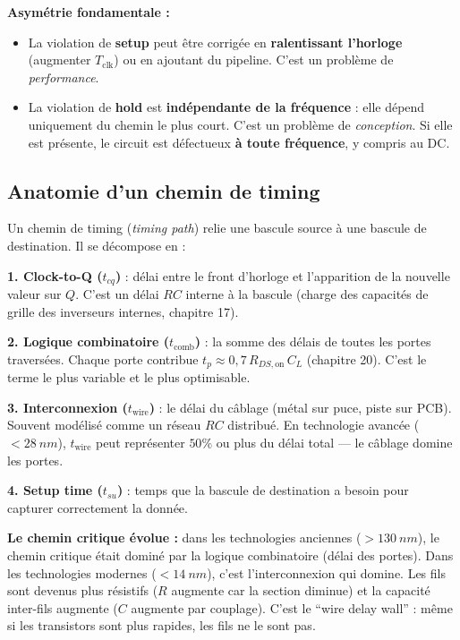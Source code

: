 \documentclass[12pt,a4paper,twoside]{book}
\begin{document}
\begin{attention}
\textbf{Asymétrie fondamentale :}
\begin{itemize}[nosep]
\item La violation de \textbf{setup} peut être corrigée en \textbf{ralentissant l'horloge} (augmenter $T_{\text{clk}}$) ou en ajoutant du pipeline. C'est un problème de \textit{performance}.
\item La violation de \textbf{hold} est \textbf{indépendante de la fréquence} : elle dépend uniquement du chemin le plus court. C'est un problème de \textit{conception}. Si elle est présente, le circuit est défectueux \textbf{à toute fréquence}, y compris au DC.
\end{itemize}
\end{attention}

\subsection{Anatomie d'un chemin de timing}

\begin{formule}
Un chemin de timing (\textit{timing path}) relie une bascule source à une bascule de destination. Il se décompose en :

\textbf{1. Clock-to-Q ($t_{cq}$)} : délai entre le front d'horloge et l'apparition de la nouvelle valeur sur $Q$. C'est un délai $RC$ interne à la bascule (charge des capacités de grille des inverseurs internes, chapitre 17).

\textbf{2. Logique combinatoire ($t_{\text{comb}}$)} : la somme des délais de toutes les portes traversées. Chaque porte contribue $t_p \approx 0{,}7\,R_{DS,\text{on}}\,C_L$ (chapitre 20). C'est le terme le plus variable et le plus optimisable.

\textbf{3. Interconnexion ($t_{\text{wire}}$)} : le délai du câblage (métal sur puce, piste sur PCB). Souvent modélisé comme un réseau $RC$ distribué. En technologie avancée ($< \SI{28}{nm}$), $t_{\text{wire}}$ peut représenter $50\%$ ou plus du délai total --- le câblage domine les portes.

\textbf{4. Setup time ($t_{su}$)} : temps que la bascule de destination a besoin pour capturer correctement la donnée.
\end{formule}

\begin{intuition}
\textbf{Le chemin critique évolue :} dans les technologies anciennes ($> \SI{130}{nm}$), le chemin critique était dominé par la logique combinatoire (délai des portes). Dans les technologies modernes ($< \SI{14}{nm}$), c'est l'interconnexion qui domine. Les fils sont devenus plus résistifs ($R$ augmente car la section diminue) et la capacité inter-fils augmente ($C$ augmente par couplage). C'est le ``wire delay wall'' : même si les transistors sont plus rapides, les fils ne le sont pas.
\end{intuition}
\end{document}
